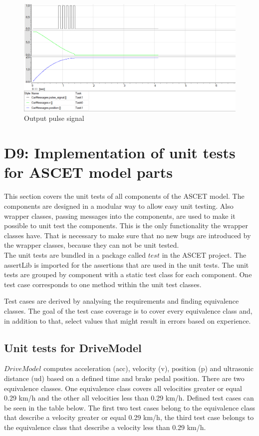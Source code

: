 \begin{figure}[H]
\centering
\includegraphics[width=1\textwidth]{images/ascet_pulsesignal.png}
\caption{Output pulse signal}
\label{fig:BlockdiagrammPulseSignalOutput}
\end{figure}

\chapter{D9: Implementation of unit tests for ASCET model parts}\label{cha:D9}
This section covers the unit tests of all components of the ASCET model.
The components are designed in a modular way to allow easy unit testing.
Also wrapper classes, passing messages into the components, are used to make it possible to unit test the components.
This is the only functionality the wrapper classes have.
That is necessary to make sure that no new bugs are introduced by the wrapper classes, because they can not be unit tested.\\
The unit tests are bundled in a package called $test$ in the ASCET project. The assertLib is imported for the assertions that are used in the unit tests. The unit tests are grouped by component with a static test class for each component. One test case corresponds to one method within the unit test classes.

Test cases are derived by analysing the requirements and finding equivalence classes.
The goal of the test case coverage is to cover every equivalence class and, in addition to that, select values that might result in errors based on experience.

\section{Unit tests for DriveModel}

$DriveModel$ computes acceleration (acc), velocity (v), position (p) and ultrasonic distance (ud) based on a defined time and brake pedal position. There are two equivalence classes. One equivalence class covers all velocities greater or equal 0.29 km/h and the other all velocities less than 0.29 km/h. Defined test cases can be seen in the table below. The first two test cases belong to the equivalence class that describe a velocity greater or equal 0.29 km/h, the third test case belongs to the equivalence class that describe a velocity less than 0.29 km/h.

